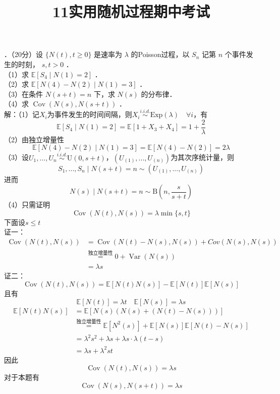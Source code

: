 \documentclass[UTF8]{ctexart}
\title{11实用随机过程期中考试}
\author{\calligra{NULIOUS}}
\date{}
\begin{document}
\maketitle
{}．（20分）设 $\{N(t), t \geq 0\}$ 是速率为 $\lambda$ 的Poisson过程，以 $S_{n}$ 记第 $n$ 个事件发生的时刻， $s, t>0$ ．\\
（1）求 $\mathbb{E}\left[S_{4} \mid N(1)=2\right]$ ．\\
（2）求 $\mathbb{E}[N(4)-N(2) \mid N(1)=3]$ ．\\
（3）在条件 $N(s+t)=n$ 下，求 $N(s)$ 的分布律．\\
（4）求 $\operatorname{Cov}(N(s), N(s+t))$ ．\\
解：（1）记$X_i$为事件发生的时间间隔，则$X_i\stackrel{i.i.d.}{\sim}\mathrm{Exp}(\lambda) \quad \forall i$，有
\[
\mathbb{E}\left[S_{4} \mid N(1)=2\right]=\mathbb{E}[1+X_3+X_4]=1+\frac{2}{\lambda}
\]
（2）由独立增量性
\[
\mathbb{E}[N(4)-N(2) \mid N(1)=3]=\mathbb{E}[N(4)-N(2) ]=2\lambda
\]
（3）设$U_1,...,U_n\stackrel{i.i.d.}{\sim}\mathrm{U}(0,s+t)$，$(U_{(1)},...,U_{(n)})$为其次序统计量，则
\[
S_1,...,S_n\mid N(s+t)=n  \sim (U_{(1)},...,U_{(n)})
\]
进而
\[
N(s)\mid N(s+t)=n \sim \mathrm{B}\left(n,\frac{s}{s+t} \right) 
\]
（4）只需证明
\[
\operatorname{Cov}\left(N(t),N(s) \right)=\lambda \min \{s,t\} 
\]
下面设$s\le t$\\
证一：
\begin{align*}
	\operatorname{Cov}\left(N(t),N(s) \right) &= \operatorname{Cov}\left(N(t)-N(s),N(s) \right)+Cov\left(N(s),N(s) \right)   \\
	&\stackrel{\text{独立增量性}}{=}0+\operatorname{Var}\left(N(s) \right) \\
	&=\lambda s
\end{align*}
证二：
\[
\operatorname{Cov}\left(N(t),N(s) \right)=\mathbb{E}\left[N(t)N(s) \right]-\mathbb{E}[N(t)]\mathbb{E}[N(s)] 
\]
且有
\[
\mathbb{E}[N(t)]=\lambda t \quad \mathbb{E}[N(s)]=\lambda s
\]
\begin{align*}
	\mathbb{E}\left[N(t)N(s) \right] & =\mathbb{E}\left[N(s)\left(N(s)+\left(N(t)-N(s) \right)  \right)  \right] \\
	& \stackrel{\text{独立增量性}}{=} \mathbb{E}\left[N^2(s) \right]+\mathbb{E}[N(s)]\mathbb{E}[N(t)-N(s)]\\
	&= \lambda^2 s^2+\lambda s + \lambda s \cdot \lambda(t-s)\\
	&=\lambda s +\lambda^2 st
\end{align*}
因此
\[
\operatorname{Cov}\left(N(t),N(s) \right)=\lambda s
\]
对于本题有
\[
\operatorname{Cov}(N(s), N(s+t))=\lambda s
\]\\
\end{document}
